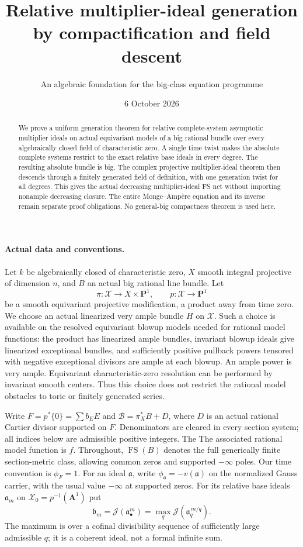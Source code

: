 \documentclass[10pt]{article}
\title{Relative multiplier-ideal generation by compactification and field descent}
\author{An algebraic foundation for the big-class equation programme}
\date{6 October 2026}
\newcommand{\FS}{\operatorname{FS}}
\newcommand{\J}{\mathcal J}
\begin{document}
\maketitle
\begin{abstract}
We prove a uniform generation theorem for relative complete-system
asymptotic multiplier ideals on actual equivariant models of a big
rational bundle over every algebraically closed field of characteristic
zero. A single time twist makes the absolute complete systems restrict
to the exact relative base ideals in every degree. The resulting absolute
bundle is big. The complex projective multiplier-ideal theorem then
descends through a finitely generated field of definition, with one
generation twist for all degrees. This gives the actual decreasing
multiplier-ideal FS net without importing nonample decreasing closure.
The entire Monge--Amp\`ere equation and its inverse remain separate
proof obligations. No general-big compactness theorem is used here.
\end{abstract}

\paragraph{Actual data and conventions.}
Let $k$ be algebraically closed of characteristic zero, $X$ smooth
integral projective of dimension $n$, and $B$ an actual big rational
line bundle. Let
\[
 \pi:\mathcal X\longrightarrow X\times\mathbf P^1,
 \qquad p:\mathcal X\longrightarrow\mathbf P^1
\]
be a smooth equivariant projective modification, a product away from
time zero. We choose an actual linearized very ample bundle $H$ on
$\mathcal X$. Such a choice is available on the resolved equivariant
blowup models needed for rational model functions: the product has
linearized ample bundles, invariant blowup ideals give linearized
exceptional bundles, and sufficiently positive pullback powers tensored
with negative exceptional divisors are ample at each blowup. An ample
power is very ample. Equivariant characteristic-zero resolution can be
performed by invariant smooth centers. Thus this choice does not restrict
the rational model obstacles to toric or finitely generated series.

Write $F=p^*\{0\}=\sum b_EE$ and
$\mathcal B=\pi_X^*B+D$, where $D$ is an actual rational Cartier
divisor supported on $F$. Denominators are cleared in every section
system; all indices below are admissible positive integers. The
The associated rational model function is $f$. Throughout,
$\FS(B)$ denotes the full generically finite section-metric class,
allowing common zeros and supported $-\infty$ poles. Our time convention
is $\phi_F=1$. For an ideal $\mathfrak a$, write
$\phi_{\mathfrak a}=-v(\mathfrak a)$ on the normalized Gauss carrier,
with the usual value $-\infty$ at supported zeros. For its relative base
ideals $\mathfrak a_m$ on $\mathcal X_0=p^{-1}(\mathbf A^1)$ put
\[
 \mathfrak b_m=\J(\mathfrak a_\bullet^m)
   =\max_q\J(\mathfrak a_q^{\,m/q}).                    \tag{1}
\]
The maximum is over a cofinal divisibility sequence of sufficiently
large admissible $q$; it is a coherent ideal, not a formal infinite sum.
\end{document}
